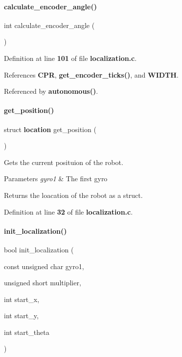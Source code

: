 \paragraph{calculate\+\_\+encoder\+\_\+angle()}
{\footnotesize\ttfamily int calculate\+\_\+encoder\+\_\+angle (\begin{DoxyParamCaption}{ }\end{DoxyParamCaption})}



Definition at line \textbf{ 101} of file \textbf{ localization.\+c}.



References \textbf{ C\+PR}, \textbf{ get\+\_\+encoder\+\_\+ticks()}, and \textbf{ W\+I\+D\+TH}.



Referenced by \textbf{ autonomous()}.

\mbox{\label{localization_8h_aadbff35bb757f60bc348d4d778f57a2f}} 
\paragraph{get\+\_\+position()}
{\footnotesize\ttfamily struct \textbf{ location} get\+\_\+position (\begin{DoxyParamCaption}{ }\end{DoxyParamCaption})}



Gets the current posituion of the robot. 


\begin{DoxyParams}{Parameters}
{\em gyro1} & The first gyro \\
\hline
\end{DoxyParams}
\begin{DoxyReturn}{Returns}
the loacation of the robot as a struct. 
\end{DoxyReturn}


Definition at line \textbf{ 32} of file \textbf{ localization.\+c}.

\mbox{\label{localization_8h_afdd0147de6aa15957e9a125f9cd20578}} 
\paragraph{init\+\_\+localization()}
{\footnotesize\ttfamily bool init\+\_\+localization (\begin{DoxyParamCaption}\item[{const unsigned char}]{gyro1,  }\item[{unsigned short}]{multiplier,  }\item[{int}]{start\+\_\+x,  }\item[{int}]{start\+\_\+y,  }\item[{int}]{start\+\_\+theta }\end{DoxyParamCaption})}



